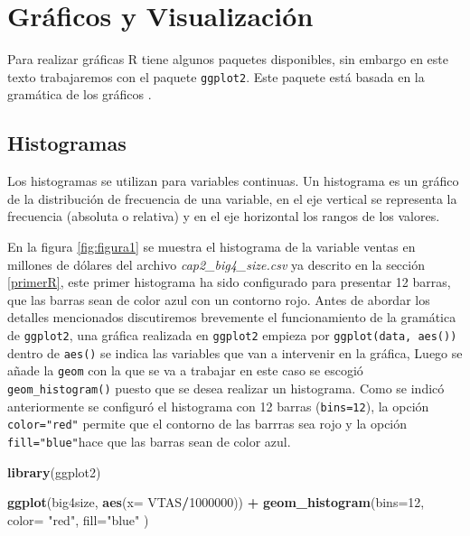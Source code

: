 \documentclass[]{book}
\newenvironment{Shaded}{\begin{snugshade}}{\end{snugshade}}
\newcommand{\KeywordTok}[1]{\textcolor[rgb]{0.13,0.29,0.53}{\textbf{#1}}}
\newcommand{\DataTypeTok}[1]{\textcolor[rgb]{0.13,0.29,0.53}{#1}}
\newcommand{\DecValTok}[1]{\textcolor[rgb]{0.00,0.00,0.81}{#1}}
\newcommand{\StringTok}[1]{\textcolor[rgb]{0.31,0.60,0.02}{#1}}
\newcommand{\OperatorTok}[1]{\textcolor[rgb]{0.81,0.36,0.00}{\textbf{#1}}}
\newcommand{\NormalTok}[1]{#1}
\begin{document}
\section{Gráficos y Visualización}\label{graficos-y-visualizacion}

Para realizar gráficas R tiene algunos paquetes disponibles, sin embargo
en este texto trabajaremos con el paquete \texttt{ggplot2}. Este paquete
está basada en la gramática de los gráficos \citep{wilkinson2005}.

\subsection{Histogramas}\label{histogramas}

Los histogramas se utilizan para variables continuas. Un histograma es
un gráfico de la distribución de frecuencia de una variable, en el eje
vertical se representa la frecuencia (absoluta o relativa) y en el eje
horizontal los rangos de los valores.

En la figura \ref{fig:figura1} se muestra el histograma de la variable
ventas en millones de dólares del archivo \emph{cap2\_big4\_size.csv} ya
descrito en la sección \ref{primerR}, este primer histograma ha sido
configurado para presentar 12 barras, que las barras sean de color azul
con un contorno rojo. Antes de abordar los detalles mencionados
discutiremos brevemente el funcionamiento de la gramática de
\texttt{ggplot2}, una gráfica realizada en \texttt{ggplot2} empieza por
\texttt{ggplot(data,\ aes())} dentro de \texttt{aes()} se indica las
variables que van a intervenir en la gráfica, Luego se añade la
\texttt{geom} con la que se va a trabajar en este caso se escogió
\texttt{geom\_histogram()} puesto que se desea realizar un histograma.
Como se indicó anteriormente se configuró el histograma con 12 barras
(\texttt{bins=12}), la opción \texttt{color="red"} permite que el
contorno de las barrras sea rojo y la opción \texttt{fill="blue"}hace
que las barras sean de color azul.

\begin{Shaded}
\begin{Highlighting}[]
\KeywordTok{library}\NormalTok{(ggplot2)}

\KeywordTok{ggplot}\NormalTok{(big4size, }\KeywordTok{aes}\NormalTok{(}\DataTypeTok{x=}\NormalTok{ VTAS}\OperatorTok{/}\DecValTok{1000000}\NormalTok{)) }\OperatorTok{+}\StringTok{ }
\StringTok{  }\KeywordTok{geom_histogram}\NormalTok{(}\DataTypeTok{bins=}\DecValTok{12}\NormalTok{, }\DataTypeTok{color=} \StringTok{"red"}\NormalTok{, }\DataTypeTok{fill=}\StringTok{"blue"}\NormalTok{ )}
\end{Highlighting}
\end{Shaded}
\end{document}
